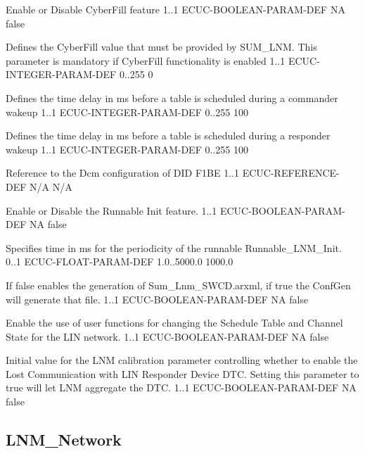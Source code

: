 {Enable or Disable CyberFill feature}
{1..1}
{ECUC-BOOLEAN-PARAM-DEF}
{NA}
{false}


{Defines the CyberFill value that must be provided by SUM_LNM. This parameter is mandatory if CyberFill functionality is enabled}
{1..1}
{ECUC-INTEGER-PARAM-DEF}
{0..255}
{0}


{Defines the time delay in ms before a table is scheduled during a commander wakeup }
{1..1}
{ECUC-INTEGER-PARAM-DEF}
{0..255}
{100}


{Defines the time delay in ms before a table is scheduled during a responder wakeup }
{1..1}
{ECUC-INTEGER-PARAM-DEF}
{0..255}
{100}


{Reference to the Dcm configuration of DID F1BE}
{1..1}
{ECUC-REFERENCE-DEF}
{N/A}
{N/A}


{Enable or Disable the Runnable Init feature.}
{1..1}
{ECUC-BOOLEAN-PARAM-DEF}
{NA}
{false}

{Specifies time in ms for the periodicity of the runnable Runnable_LNM_Init.}
{0..1}
{ECUC-FLOAT-PARAM-DEF}
{1.0..5000.0}
{1000.0}

{

{If false enables the generation of Sum_Lnm_SWCD.arxml, if true the ConfGen will generate that file.}
{1..1}
{ECUC-BOOLEAN-PARAM-DEF}
{NA}
{false}

}
{}


{Enable the use of user functions for changing the Schedule Table and Channel State for the LIN network.}
{1..1}
{ECUC-BOOLEAN-PARAM-DEF}
{NA}
{false}


{Initial value for the LNM calibration parameter controlling whether to enable the Lost Communication with LIN Responder Device DTC. Setting this parameter to true will let LNM aggregate the DTC.}
{1..1}
{ECUC-BOOLEAN-PARAM-DEF}
{NA}
{false}

\subsection{LNM_Network}


